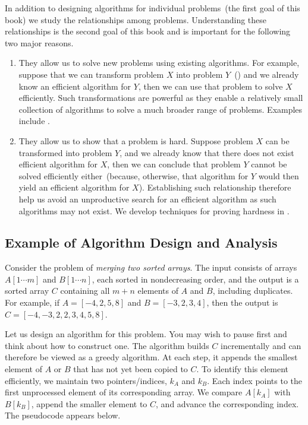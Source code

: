 In addition to designing algorithms for individual problems~(the first goal
of this book) we study the relationships among problems. Understanding these
relationships is the second goal of this book and is important for the following
two major reasons.
\begin{enumerate}
\item They allow us to solve new problems using existing algorithms. For
example, suppose that we can transform problem $X$ into problem $Y$~()
and we already know an efficient algorithm for $Y$, then we can use that problem
to solve $X$ efficiently. 
Such transformations are powerful as they enable a relatively small
collection of algorithms to solve a much broader range of problems. Examples
include .
\item They allow us to show that a problem is hard. Suppose 
problem $X$ can be transformed into problem $Y$, and we already know that
there does not exist
efficient algorithm for $X$, then we can conclude that problem $Y$ 
cannot be solved efficiently either~(because, otherwise, 
that algorithm for $Y$ would then yield an efficient algorithm for $X$).
Establishing such relationship therefore help us
avoid an unproductive search for an efficient algorithm as such algorithms
may not exist. We develop techniques for proving hardness in
.
\end{enumerate}

\subsection*{Example of Algorithm Design and Analysis}

Consider the problem of \emph{merging two sorted arrays}. The input consists
of arrays $A[1\cdots m]$ and $B[1\cdots n]$, each sorted in nondecreasing
order, and the output is a sorted array $C$ containing all $m+n$ elements of
$A$ and $B$, including duplicates. For example, if
$A=[-4,2,5,8]$ and $B=[-3,2,3,4]$, then the output is
$C=[-4,-3,2,2,3,4,5,8]$.

Let us design an algorithm for this problem. You may wish to pause first and
think about how to construct one. The algorithm builds $C$ incrementally and
can therefore be viewed as a greedy algorithm. At each step, it appends the
smallest element of $A$ or $B$ that has not yet been copied to $C$. To identify
this element efficiently, we maintain two pointers/indices, $k_A$ and $k_B$. Each index
points to the first unprocessed element of its corresponding array. We compare
$A[k_A]$ with $B[k_B]$, append the smaller element to $C$, and advance the
corresponding index. The pseudocode appears below.

